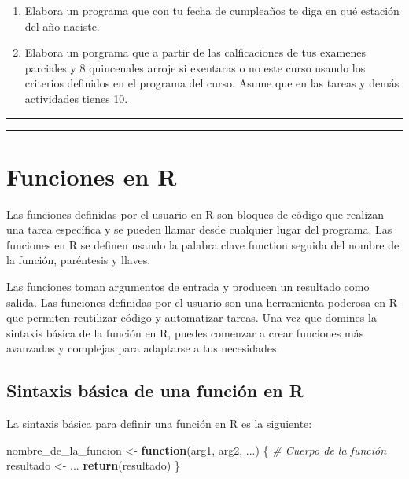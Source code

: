 \documentclass[
]{book}
\newenvironment{Shaded}{\begin{snugshade}}{\end{snugshade}}
\newcommand{\CommentTok}[1]{\textcolor[rgb]{0.56,0.35,0.01}{\textit{#1}}}
\newcommand{\ControlFlowTok}[1]{\textcolor[rgb]{0.13,0.29,0.53}{\textbf{#1}}}
\newcommand{\FunctionTok}[1]{\textcolor[rgb]{0.13,0.29,0.53}{\textbf{#1}}}
\newcommand{\NormalTok}[1]{#1}
\newcommand{\OtherTok}[1]{\textcolor[rgb]{0.56,0.35,0.01}{#1}}
\begin{document}
\begin{enumerate}
\def\labelenumi{\arabic{enumi}.}
\item
  Elabora un programa que con tu fecha de cumpleaños te diga en qué estación del año naciste.
\item
  Elabora un porgrama que a partir de las calficaciones de tus examenes parciales y 8 quincenales arroje si exentaras o no este curso usando los criterios definidos en el programa del curso. Asume que en las tareas y demás actividades tienes 10.
\end{enumerate}

\begin{center}\rule{0.5\linewidth}{0.5pt}\end{center}

\begin{center}\rule{0.5\linewidth}{0.5pt}\end{center}

\hypertarget{functions}{%
\chapter{Funciones en R}\label{functions}}

Las funciones definidas por el usuario en R son bloques de código que realizan una tarea específica y se pueden llamar desde cualquier lugar del programa. Las funciones en R se definen usando la palabra clave function seguida del nombre de la función, paréntesis y llaves.

Las funciones toman argumentos de entrada y producen un resultado como salida. Las funciones definidas por el usuario son una herramienta poderosa en R que permiten reutilizar código y automatizar tareas. Una vez que domines la sintaxis básica de la función en R, puedes comenzar a crear funciones más avanzadas y complejas para adaptarse a tus necesidades.

\hypertarget{sintaxis-buxe1sica-de-una-funciuxf3n-en-r}{%
\section{Sintaxis básica de una función en R}\label{sintaxis-buxe1sica-de-una-funciuxf3n-en-r}}

La sintaxis básica para definir una función en R es la siguiente:

\begin{Shaded}
\begin{Highlighting}[]
\NormalTok{nombre\_de\_la\_funcion }\OtherTok{\textless{}{-}} \ControlFlowTok{function}\NormalTok{(arg1, arg2, ...) \{}
  \CommentTok{\# Cuerpo de la función}
\NormalTok{  resultado }\OtherTok{\textless{}{-}}\NormalTok{ ...}
  \FunctionTok{return}\NormalTok{(resultado)}
\NormalTok{\}}
\end{Highlighting}
\end{Shaded}
\end{document}
